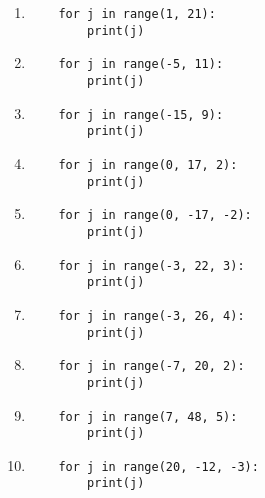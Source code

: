 \documentclass[a4paper]{article}
\begin{document}
\begin{enumerate}[label=\arabic*.]
    \lstset{numbers=none}
    \item \begin{lstlisting}
    for j in range(1, 21):
        print(j)
    \end{lstlisting}

    \item \begin{lstlisting}
    for j in range(-5, 11):
        print(j)
    \end{lstlisting}

    \item \begin{lstlisting}
    for j in range(-15, 9):
        print(j)
    \end{lstlisting}

    \item \begin{lstlisting}
    for j in range(0, 17, 2):
        print(j)
    \end{lstlisting}

    \item \begin{lstlisting}
    for j in range(0, -17, -2):
        print(j)
    \end{lstlisting}

    \item \begin{lstlisting}
    for j in range(-3, 22, 3):
        print(j)
    \end{lstlisting}

    \item \begin{lstlisting}
    for j in range(-3, 26, 4):
        print(j)
    \end{lstlisting}

    \item \begin{lstlisting}
    for j in range(-7, 20, 2):
        print(j)
    \end{lstlisting}

    \item \begin{lstlisting}
    for j in range(7, 48, 5):
        print(j)
    \end{lstlisting}

    \item \begin{lstlisting}
    for j in range(20, -12, -3):
        print(j)
    \end{lstlisting}
\end{enumerate}
\end{document}

